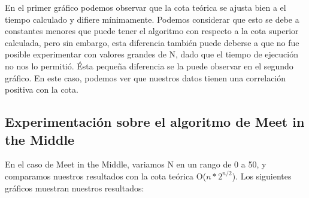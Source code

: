 En el primer gráfico podemos observar que la cota teórica se ajusta bien a el tiempo calculado y difiere mínimamente. Podemos considerar que esto se debe a constantes menores que puede tener el algoritmo con respecto a la cota superior calculada, pero sin embargo, esta diferencia también puede deberse a que no fue posible experimentar con valores grandes de N, dado que el tiempo de ejecución no nos lo permitió.
\newline
Ésta pequeña diferencia se la puede observar en el segundo gráfico. En este caso, podemos ver que nuestros datos tienen una correlación positiva con la cota.

\subsection{Experimentación sobre el algoritmo de Meet in the Middle}

En el caso de Meet in the Middle, variamos N en un rango de 0 a 50, y comparamos nuestros resultados con la cota teórica O($n*2^{n/2}$). Los siguientes gráficos muestran nuestros resultados:

